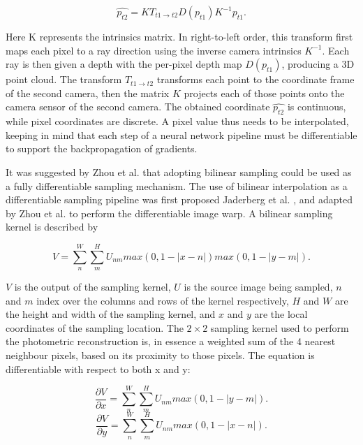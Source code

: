 \documentclass[openany]{book}
\begin{document}
\begin{equation}
\hat{p_{t2}} = KT_{t1\rightarrow t2} D(p_{t1}) K^{-1} p_{t1}.
\end{equation}

Here K represents the intrinsics matrix. In right-to-left order, this transform first maps each pixel to a ray direction using the inverse camera intrinsics $K^{-1}$. Each ray is then given a depth with the per-pixel depth map $D(p_{t1})$, producing a 3D point cloud. The transform $T_{t1 \rightarrow t2}$ transforms each point to the coordinate frame of the second camera, then the matrix $K$ projects each of those points onto the camera sensor of the second camera. The obtained coordinate $\hat{p_{t2}}$ is continuous, while pixel coordinates are discrete. A pixel value thus needs to be interpolated, keeping in mind that each step of a neural network pipeline must be differentiable to support the backpropagation of gradients. 

It was suggested by Zhou et al. \cite{zhou2017unsupervised} that adopting bilinear sampling could be used as a fully differentiable sampling mechanism. The use of bilinear interpolation as a differentiable sampling pipeline was first proposed Jaderberg et al. \cite{jaderberg2015spatialtransformer}, and adapted by Zhou et al. \cite{zhou2017unsupervised} to perform the differentiable image warp. A bilinear sampling kernel is described by 

\begin{equation}
    V = \sum_n^W \sum_m^H U_{nm} max (0, 1-|x - n|) max(0, 1-|y - m|).
\end{equation}

$V$ is the output of the sampling kernel, $U$ is the source image being sampled, $n$ and $m$ index over the columns and rows of the kernel respectively, $H$ and $W$ are the height and width of the sampling kernel, and $x$ and $y$ are the local coordinates of the sampling location. The $2 \times 2$ sampling kernel used to perform the photometric reconstruction is, in essence a weighted sum of the 4 nearest neighbour pixels, based on its proximity to those pixels. The equation is differentiable with respect to both x and y:


\begin{equation}
    \frac{\partial{V}}{\partial{x}} = \sum_n^W \sum_m^H U_{nm} max(0, 1-|y - m|).
\end{equation}
\begin{equation}
    \frac{\partial{V}}{\partial{y}} = \sum_n^W \sum_m^H U_{nm} max(0, 1-|x - n|).
\end{equation}
\end{document}
